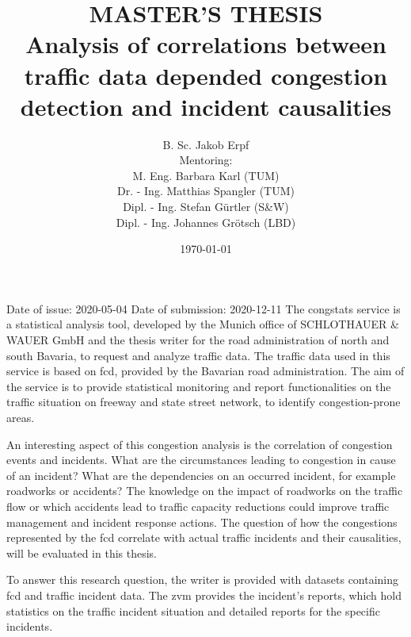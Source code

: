 \documentclass[a4paper,12pt]{report}
\begin{document}
\showthe\textwidth
\title{MASTER'S THESIS\\
[1cm]
\smaller Analysis of correlations between traffic data depended congestion detection and incident causalities}
\author{
B. Sc. Jakob Erpf\\ 
[1cm]
\small Mentoring:\\ 
\small M. Eng. Barbara Karl (TUM)\\ 
\small Dr. - Ing. Matthias Spangler (TUM)\\ 
\small Dipl. - Ing. Stefan Gürtler (S\&W)\\
\small Dipl. - Ing. Johannes Grötsch (LBD)
}
\date{\today}
\maketitle
\clearpage
\renewcommand\abstractname{Topic}
\abstract{}
Date of issue: 2020-05-04\newline
Date of submission:	2020-12-11\newline
\newline
The \gls{congstats} service is a statistical analysis tool, developed by the Munich office of SCHLOTHAUER \& WAUER GmbH and the thesis writer for the road administration of north and south Bavaria, to request and analyze traffic data. The traffic data used in this service is based on \acrfull{fcd}, provided by the Bavarian road administration. The aim of the service is to provide statistical monitoring and report functionalities on the traffic situation on freeway and state street network, to identify congestion-prone areas.

An interesting aspect of this congestion analysis is the correlation of congestion events and incidents. What are the circumstances leading to congestion in cause of an incident? What are the dependencies on an occurred incident, for example roadworks or accidents? The knowledge on the impact of roadworks on the traffic flow or which accidents lead to traffic capacity reductions could improve traffic management and incident response actions. The question of how the congestions represented by the \acrshort{fcd} correlate with actual traffic incidents and their causalities, will be evaluated in this thesis. 

To answer this research question, the writer is provided with datasets containing \acrshort{fcd} and traffic incident data. The \acrfull{zvm} provides the incident’s reports, which hold statistics on the traffic incident situation and detailed reports for the specific incidents.
\end{document}
